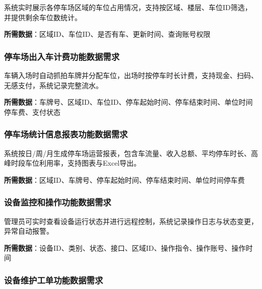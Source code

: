 \documentclass[]{article}
\begin{document}
系统实时展示各停车场区域的车位占用情况，支持按区域、楼层、车位ID筛选，并提供剩余车位数统计。

\textbf{所需数据}：区域ID、车位ID、是否有车、更新时间、查询账号权限

\hypertarget{ux505cux8f66ux573aux51faux5165ux8f66ux8ba1ux8d39ux529fux80fdux6570ux636eux9700ux6c42}{%
\subsubsection{停车场出入车计费功能数据需求}\label{ux505cux8f66ux573aux51faux5165ux8f66ux8ba1ux8d39ux529fux80fdux6570ux636eux9700ux6c42}}

车辆入场时自动抓拍车牌并分配车位，出场时按停车时长计费，支持现金、扫码、无感支付，系统记录完整流水。

\textbf{所需数据}：车牌号、区域ID、车位ID、停车起始时间、停车结束时间、单位时间停车费、支付状态

\hypertarget{ux505cux8f66ux573aux7edfux8ba1ux4fe1ux606fux62a5ux8868ux529fux80fdux6570ux636eux9700ux6c42}{%
\subsubsection{停车场统计信息报表功能数据需求}\label{ux505cux8f66ux573aux7edfux8ba1ux4fe1ux606fux62a5ux8868ux529fux80fdux6570ux636eux9700ux6c42}}

系统按日/周/月生成停车场运营报表，包含车流量、收入总额、平均停车时长、高峰时段车位利用率，支持图表与Excel导出。

\textbf{所需数据}：区域ID、车牌号、停车起始时间、停车结束时间、单位时间停车费

\hypertarget{ux8bbeux5907ux76d1ux63a7ux548cux64cdux4f5cux529fux80fdux6570ux636eux9700ux6c42}{%
\subsubsection{设备监控和操作功能数据需求}\label{ux8bbeux5907ux76d1ux63a7ux548cux64cdux4f5cux529fux80fdux6570ux636eux9700ux6c42}}

管理员可实时查看设备运行状态并进行远程控制，系统记录操作日志与状态变更，异常自动报警。

\textbf{所需数据}：设备ID、类别、状态、接口、区域ID、操作指令、操作账号、操作时间

\hypertarget{ux8bbeux5907ux7ef4ux62a4ux5de5ux5355ux529fux80fdux6570ux636eux9700ux6c42}{%
\subsubsection{设备维护工单功能数据需求}\label{ux8bbeux5907ux7ef4ux62a4ux5de5ux5355ux529fux80fdux6570ux636eux9700ux6c42}}
\end{document}

